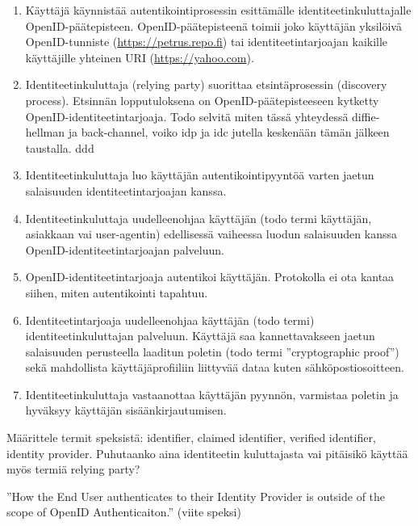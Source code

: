 \documentclass[finnish,gradu]{tktltiki}
\begin{document}
  \begin{enumerate}

    \item Käyttäjä käynnistää autentikointiprosessin esittämälle identiteetinkuluttajalle OpenID-päätepisteen. OpenID-päätepisteenä toimii joko käyttäjän yksilöivä OpenID-tunniste (\url{https://petrus.repo.fi}) tai identiteetintarjoajan kaikille käyttäjille yhteinen URI (\url{https://yahoo.com}).

    \item Identiteetinkuluttaja (relying party) suorittaa etsintäprosessin (discovery process). Etsinnän lopputuloksena on OpenID-päätepisteeseen kytketty OpenID-identiteetintarjoaja. Todo selvitä miten tässä yhteydessä diffie-hellman ja back-channel, voiko idp ja idc jutella keskenään tämän jälkeen taustalla. ddd

    \item Identiteetinkuluttaja luo käyttäjän autentikointipyyntöä varten jaetun salaisuuden identiteetintarjoajan kanssa.

    \item Identiteetinkuluttaja uudelleenohjaa käyttäjän (todo termi käyttäjän, asiakkaan vai user-agentin) edellisessä vaiheessa luodun salaisuuden kanssa OpenID-identiteetintarjoajan palveluun.

    \item OpenID-identiteetintarjoaja autentikoi käyttäjän. Protokolla ei ota kantaa siihen, miten autentikointi tapahtuu.

    \item Identiteetintarjoaja uudelleenohjaa käyttäjän (todo termi) identiteetinkuluttajan palveluun. Käyttäjä saa kannettavakseen jaetun salaisuuden perusteella laaditun poletin (todo termi ''cryptographic proof'') sekä mahdollista käyttäjäprofiiliin liittyvää dataa kuten sähköpostiosoitteen.

    \item Identiteetinkuluttaja vastaanottaa käyttäjän pyynnön, varmistaa poletin ja hyväksyy käyttäjän sisäänkirjautumisen.
  \end{enumerate}

  Määrittele termit speksistä: identifier, claimed identifier, verified identifier, identity provider.
  Puhutaanko aina identiteetin kuluttajasta vai pitäisikö käyttää myös termiä relying party?

  ''How the End User authenticates to their Identity Provider is outside of the scope of OpenID Authenticaiton.'' (viite speksi)
\end{document}
